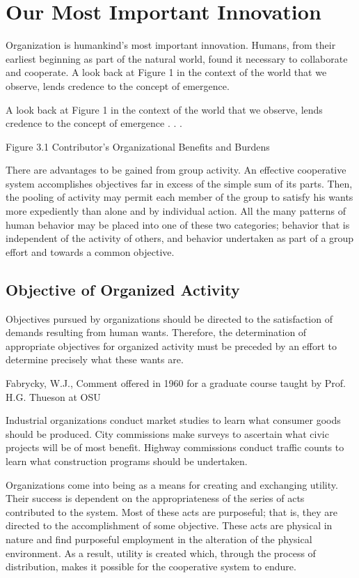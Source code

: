 \section{Our Most Important Innovation}


Organization is humankind’s most important innovation. Humans, from their earliest beginning as part of the natural world, found it necessary to collaborate and cooperate. A look back at Figure 1 in the context of the world that we observe, lends credence to the concept of emergence.

A look back at Figure 1 in the context of the world that we observe, lends credence to the concept of emergence . . . 

Figure 3.1 Contributor’s Organizational Benefits and Burdens

There are advantages to be gained from group activity. An effective cooperative system accomplishes objectives far in excess of the simple sum of its parts. Then, the pooling of activity may permit each member of the group to satisfy his wants more expediently than alone and by individual action. All the many patterns of human behavior may be placed into one of these two categories; behavior that is independent of the activity of others, and behavior undertaken as part of a group effort and towards a common objective.

\subsection{Objective of Organized Activity}

Objectives pursued by organizations should be directed to the satisfaction of demands resulting from human wants. Therefore, the determination of appropriate objectives for organized activity must be preceded by an effort to determine precisely what these wants are. 

Fabrycky, W.J., Comment offered in 1960 for a graduate course taught by Prof. H.G. Thueson at OSU

Industrial organizations conduct market studies to learn what consumer goods should be produced. City commissions make surveys to ascertain what civic projects will be of most benefit. Highway commissions conduct traffic counts to learn what construction programs should be undertaken.

Organizations come into being as a means for creating and exchanging utility. Their success is dependent on the appropriateness of the series of acts contributed to the system. Most of these acts are purposeful; that is, they are directed to the accomplishment of some objective. These acts are physical in nature and find purposeful employment in the alteration of the physical environment. As a result, utility is created which, through the process of distribution, makes it possible for the cooperative system to endure.

